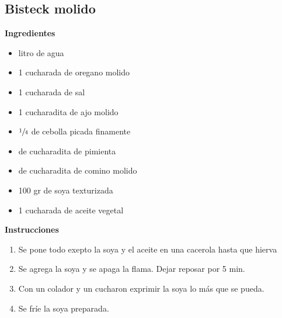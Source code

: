 \subsection{Bisteck molido}
\textbf{Ingredientes}
\begin{itemize}
\item {} litro de agua
\item 1 cucharada de oregano molido
\item 1 cucharada de sal
\item 1 cucharadita de ajo molido
\item $\sfrac{1}{4}$ de cebolla picada finamente
\item {} de cucharadita de pimienta
\item {} de cucharadita de comino molido
\item 100 gr de soya texturizada
\item 1 cucharada de aceite vegetal
\end{itemize}

\textbf{Instrucciones}
\begin{enumerate}
\item Se pone todo exepto la soya y el aceite en una cacerola hasta que hierva
\item Se agrega la soya y se apaga la flama. Dejar reposar por 5 min.
\item Con un colador y un cucharon exprimir la soya lo m\'as que se pueda. 
\item Se fr\'ie la soya preparada.
\end{enumerate}
